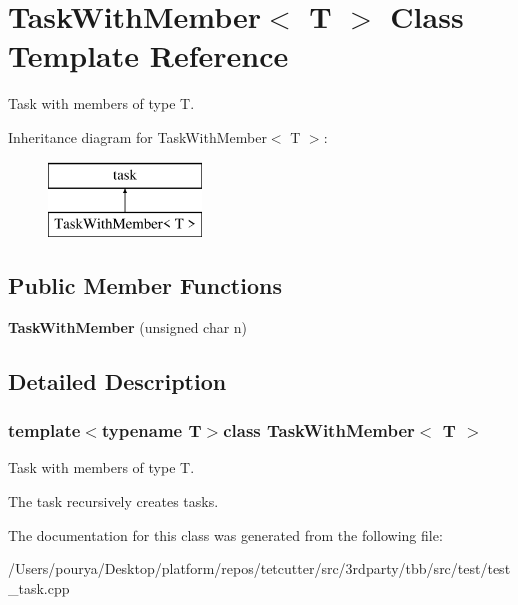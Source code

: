 \hypertarget{classTaskWithMember}{}\section{Task\+With\+Member$<$ T $>$ Class Template Reference}
\label{classTaskWithMember}


Task with members of type T.  


Inheritance diagram for Task\+With\+Member$<$ T $>$\+:\begin{figure}[H]
\begin{center}
\leavevmode
\includegraphics[height=2.000000cm]{classTaskWithMember}
\end{center}
\end{figure}
\subsection*{Public Member Functions}
\begin{DoxyCompactItemize}
\item 
\hypertarget{classTaskWithMember_ac3b2367dfc69061fa05264da054cbfa2}{}{\bfseries Task\+With\+Member} (unsigned char n)\label{classTaskWithMember_ac3b2367dfc69061fa05264da054cbfa2}

\end{DoxyCompactItemize}


\subsection{Detailed Description}
\subsubsection*{template$<$typename T$>$class Task\+With\+Member$<$ T $>$}

Task with members of type T. 

The task recursively creates tasks. 

The documentation for this class was generated from the following file\+:\begin{DoxyCompactItemize}
\item 
/\+Users/pourya/\+Desktop/platform/repos/tetcutter/src/3rdparty/tbb/src/test/test\+\_\+task.\+cpp\end{DoxyCompactItemize}
